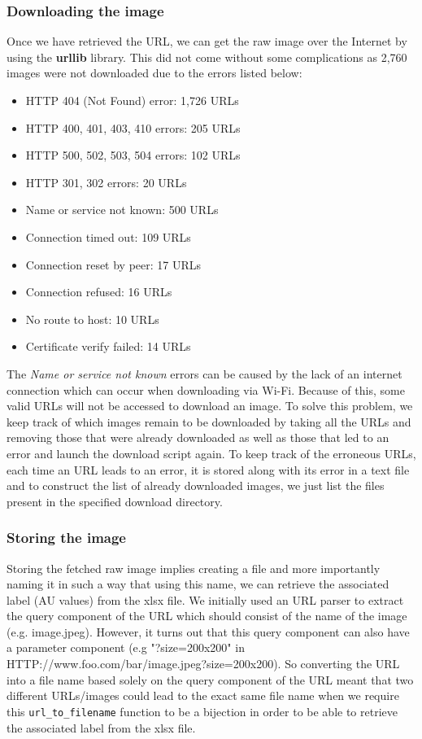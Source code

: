 \documentclass[12pt,twoside]{article}
\begin{document}
\subsubsection{Downloading the image}

Once we have retrieved the URL, we can get the raw image over the Internet by using the \textbf{urllib} library. This did not come without some complications as 2,760 images were not downloaded due to the errors listed below:

\begin{itemize}
\item HTTP 404 (Not Found) error: 1,726 URLs
\item HTTP 400, 401, 403, 410 errors: 205 URLs
\item HTTP 500, 502, 503, 504 errors: 102 URLs
\item HTTP 301, 302 errors: 20 URLs
\item Name or service not known: 500 URLs
\item Connection timed out: 109 URLs
\item Connection reset by peer: 17 URLs
\item Connection refused: 16 URLs
\item No route to host: 10 URLs
\item Certificate verify failed: 14 URLs
\end{itemize}

The \textit{Name or service not known} errors can be caused by the lack of an internet connection which can occur when downloading via Wi-Fi. Because of this, some valid URLs will not be accessed to download an image. To solve this problem, we keep track of which images remain to be downloaded by taking all the URLs and removing those that were already downloaded as well as those that led to an error and launch the download script again. To keep track of the erroneous URLs, each time an URL leads to an error, it is stored along with its error in a text file and to construct the list of already downloaded images, we just list the files present in the specified download directory.

\subsubsection{Storing the image}

Storing the fetched raw image implies creating a file and more importantly naming it in such a way that using this name, we can retrieve the associated label (AU values) from the xlsx file. We initially used an URL parser to extract the query component of the URL which should consist of the name of the image (e.g. image.jpeg). However, it turns out that this query component can also have a parameter component (e.g "?size=200x200" in HTTP://www.foo.com/bar/image.jpeg?size=200x200). So converting the URL into a file name based solely on the query component of the URL meant that two different URLs/images could lead to the exact same file name when we require this \texttt{url\_to\_filename} function to be a bijection in order to be able to retrieve the associated label from the xlsx file.
\end{document}
